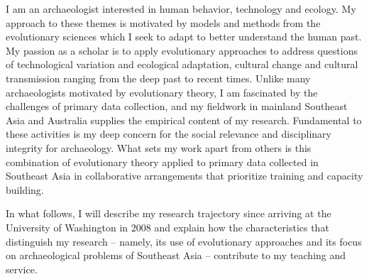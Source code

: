 \documentclass[11pt,article,oneside]{memoir}
\begin{document}


\nonzeroparskip
\setlength{\parindent}{0pt}

\bigskip       


I am an archaeologist interested in human behavior, technology and ecology. My approach to these themes is motivated by models and methods from the evolutionary sciences which I seek to adapt to better understand the human past. My passion as a scholar is to apply evolutionary approaches to address questions of technological variation and ecological adaptation, cultural change and cultural transmission ranging from the deep past to recent times. Unlike many archaeologists motivated by evolutionary theory, I am fascinated by the challenges of primary data collection, and my fieldwork in mainland Southeast Asia and Australia supplies the empirical content of my research. Fundamental to these activities is my deep concern for the social relevance and disciplinary integrity for archaeology. What sets my work apart from others is this combination of evolutionary theory applied to primary data collected in Southeast Asia in collaborative arrangements that prioritize training and capacity building.  

In what follows, I will describe my research trajectory since arriving at the University of Washington in 2008 and explain how the characteristics that distinguish my research – namely, its use of evolutionary approaches and its focus on archaeological problems of Southeast Asia – contribute to my teaching and service. 

\bigskip  

\end{document}
